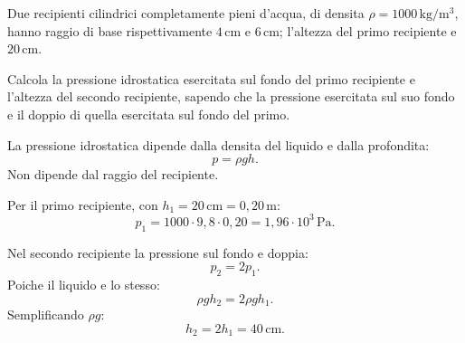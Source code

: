 
\begin{esercizio}
Due recipienti cilindrici completamente pieni d'acqua, di densita
$\rho = 1000\,\mathrm{kg/m^3}$, hanno raggio di base rispettivamente
$4\,\mathrm{cm}$ e $6\,\mathrm{cm}$; l'altezza del primo recipiente e
$20\,\mathrm{cm}$.

Calcola la pressione idrostatica esercitata sul fondo del primo recipiente e
l'altezza del secondo recipiente, sapendo che la pressione esercitata sul suo
fondo e il doppio di quella esercitata sul fondo del primo.
\end{esercizio}

\begin{soluzione}
La pressione idrostatica dipende dalla densita del liquido e dalla profondita:
\[
p=\rho gh.
\]
Non dipende dal raggio del recipiente.

Per il primo recipiente, con \(h_1=20\,\mathrm{cm}=0{,}20\,\mathrm{m}\):
\[
p_1=1000\cdot 9{,}8\cdot 0{,}20
=1{,}96\cdot 10^3\,\mathrm{Pa}.
\]

Nel secondo recipiente la pressione sul fondo e doppia:
\[
p_2=2p_1.
\]
Poiche il liquido e lo stesso:
\[
\rho gh_2=2\rho gh_1.
\]
Semplificando \(\rho g\):
\[
h_2=2h_1=40\,\mathrm{cm}.
\]
\end{soluzione}
